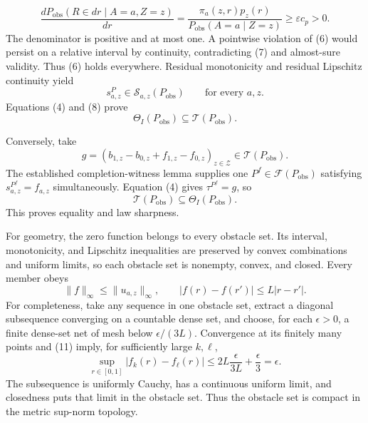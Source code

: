 \[
\frac{dP_{\mathrm{obs}}(R\in dr\mid A=a,Z=z)}{dr}
=\frac{\pi_a(z,r)p_z(r)}
{P_{\mathrm{obs}}(A=a\mid Z=z)}
\geq\varepsilon c_p>0.
\tag{7}
\]
The denominator is positive and at most one.  A pointwise violation of (6) would persist on a relative interval by continuity, contradicting (7) and almost-sure validity.  Thus (6) holds everywhere.  Residual monotonicity and residual Lipschitz continuity yield
\[
s^P_{a,z}\in\mathcal S_{a,z}(P_{\mathrm{obs}})
\qquad\text{for every }a,z.
\tag{8}
\]
Equations (4) and (8) prove
\[
\Theta_I(P_{\mathrm{obs}})\subseteq\mathcal T(P_{\mathrm{obs}}).
\tag{9}
\]

Conversely, take
\[
g=(b_{1,z}-b_{0,z}+f_{1,z}-f_{0,z})_{z\in\mathcal Z}
\in\mathcal T(P_{\mathrm{obs}}).
\]
The established completion-witness lemma supplies one \(P^f\in\mathcal F(P_{\mathrm{obs}})\) satisfying \(s^{P^f}_{a,z}=f_{a,z}\) simultaneously.  Equation (4) gives \(\tau^{P^f}=g\), so
\[
\mathcal T(P_{\mathrm{obs}})\subseteq\Theta_I(P_{\mathrm{obs}}).
\tag{10}
\]
This proves equality and law sharpness.

For geometry, the zero function belongs to every obstacle set.  Its interval, monotonicity, and Lipschitz inequalities are preserved by convex combinations and uniform limits, so each obstacle set is nonempty, convex, and closed.  Every member obeys
\[
\|f\|_\infty\leq\|u_{a,z}\|_\infty,\qquad
|f(r)-f(r')|\leq L|r-r'|.
\tag{11}
\]
For completeness, take any sequence in one obstacle set, extract a diagonal subsequence converging on a countable dense set, and choose, for each \(\epsilon>0\), a finite dense-set net of mesh below \(\epsilon/(3L)\).  Convergence at its finitely many points and (11) imply, for sufficiently large \(k,\ell\),
\[
\sup_{r\in[0,1]}|f_k(r)-f_\ell(r)|
\leq2L\frac{\epsilon}{3L}+\frac{\epsilon}{3}
=\epsilon.
\tag{12}
\]
The subsequence is uniformly Cauchy, has a continuous uniform limit, and closedness puts that limit in the obstacle set.  Thus the obstacle set is compact in the metric sup-norm topology.


